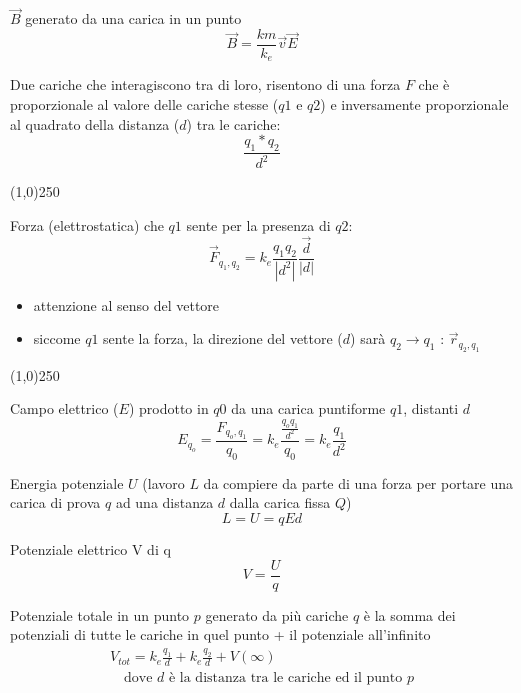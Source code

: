 \documentclass[14pt]{extarticle}
\begin{document}
$\overrightarrow{B}$ generato da una carica in un punto
\begin{equation*}
    \overrightarrow{B}=\frac{km}{k_e}\overrightarrow{v}\overrightarrow{E}
\end{equation*}



Due cariche che interagiscono tra di loro, risentono di una forza $F$ che è proporzionale al valore delle cariche stesse ($q1$ e $q2$) e inversamente proporzionale al quadrato della distanza ($d$) tra le cariche:
\begin{equation*}
    \frac{q_1*q_2}{d^2}
\end{equation*}
\begin{center}
    \line(1,0){250}
\end{center}
Forza (elettrostatica) che $q1$ sente per la presenza di $q2$:
\begin{equation*}
    \overrightarrow{F}_{q_1,q_2}=k_e\frac{q_1q_2}{|d^2|}\frac{\overrightarrow{d}}{|d|}
\end{equation*}
\begin{itemize}
    \item attenzione al senso del vettore
    \item siccome $q1$ sente la forza, la direzione del vettore ($d$) sarà $q_2\rightarrow q_1$ : $\overrightarrow{r}_{q_2,q_1}$
\end{itemize}


\begin{center}
    \line(1,0){250}
\end{center}
Campo elettrico ($E$) prodotto in $q0$ da una carica puntiforme $q1$, distanti $d$
\begin{equation*}
    E_{q_o}=\frac{F_{q_o,q_1}}{q_0}=k_e\frac{\frac{q_oq_1}{d^2}}{q_0}=k_e\frac{q_1}{d^2}
\end{equation*}

Energia potenziale $U$ (lavoro $L$ da compiere da parte di una forza per portare una carica di prova $q$ ad una distanza $d$ dalla carica fissa $Q$)
\begin{equation*}
    L=U=qEd
\end{equation*}


Potenziale elettrico V di q
\begin{equation*}
    V=\frac{U}{q}
\end{equation*}

Potenziale totale in un punto $p$ generato da più cariche $q$ è la somma dei potenziali di tutte le cariche in quel punto + il potenziale all'infinito
\begin{align*}
    V_{tot} = k_e\frac{q_1}{d}+k_e\frac{q_2}{d}+V(\infty) \\
    \quad\text{dove $d$ è la distanza tra le cariche ed il punto $p$}
\end{align*}
\end{document}

